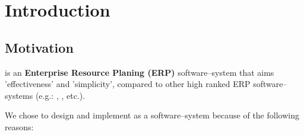 \chapter{Introduction}

\vspace{-2em}


\vspace{1em}

\section{Motivation}

\yerotherpblack is an \textbf{Enterprise Resource Planing (ERP)}
software--system that aims 'effectiveness' and 'simplicity',
compared to other high ranked ERP software--systems
(e.g.: \sageerp, \saperp, etc.).

We chose to design and implement \yerotherpblack as
a \thickclient software--system because of the
following reasons:

